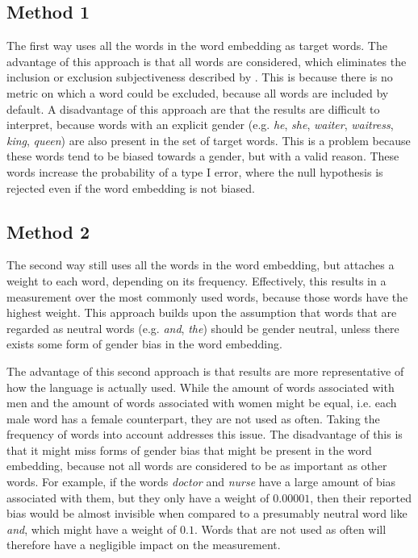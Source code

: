 \subsection{Method 1}
\label{method:1}
The first way uses
all the words in the word embedding as target words. The advantage of this approach is
that all words are considered, which eliminates the inclusion or exclusion subjectiveness
described by \textcite{nissim_fair_is_better_2020}.  This is because there is no metric
on which a word could be excluded, because all words are included by default.
A disadvantage of this approach
are that the results are difficult to interpret, because words with an explicit
gender (e.g. \textit{he}, \textit{she}, \textit{waiter}, \textit{waitress},
\textit{king}, \textit{queen}) are also
present in the set of target words. This is a problem because these words tend to be biased
towards a gender, but with a valid reason. These words increase the probability of a
type I error, where the null hypothesis is rejected even if the word embedding is not
biased.

\subsection{Method 2}
\label{method:2}
The second way still uses all the words in the word embedding, but attaches a weight to
each word, depending on its frequency. Effectively, this results in a measurement over
the most commonly used words, because those words have the highest weight.
This approach builds upon the assumption that words that are regarded as neutral words
(e.g. \textit{and}, \textit{the}) should be gender neutral, unless there exists some form
of gender bias in the word embedding.

The advantage of this second approach is that results are more representative of how
the language is actually used. While the amount of words associated with men and the
amount of words associated with women might be equal, i.e. each male word has a female
counterpart, they are not used as often.
Taking the frequency of words into account addresses this issue. 
The disadvantage of this is that
it might miss forms of gender bias that might be present in the word embedding, because
not all words are considered to be as important as other words. For example, if the words
\textit{doctor} and \textit{nurse} have a large amount of bias associated with them,
but they only have a weight of $0.00001$, then their reported bias would be almost
invisible when compared to a presumably neutral word like \textit{and}, which might have
a weight of $0.1$. Words that are not used as often will therefore have a negligible impact
on the measurement.

